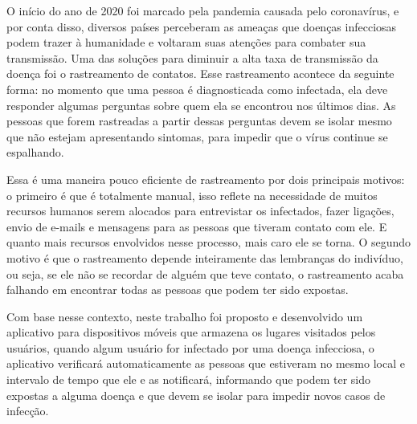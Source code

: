 \documentclass[Portugues,Draft]{tese-FT}
\begin{document}
\begin{resumo}
O início do ano de 2020 foi marcado pela pandemia causada pelo coronavírus, e por conta disso, diversos países perceberam as ameaças que doenças infecciosas podem trazer à humanidade e voltaram suas atenções para combater sua transmissão. 
Uma das soluções para diminuir a alta taxa de transmissão da doença foi o rastreamento de contatos. Esse rastreamento acontece da seguinte forma: no momento que uma pessoa é diagnosticada como infectada, ela deve responder algumas perguntas sobre quem ela se encontrou nos últimos dias. As pessoas que forem rastreadas a partir dessas perguntas devem se isolar mesmo que não estejam apresentando sintomas, para impedir que o vírus continue se espalhando.

Essa é uma maneira pouco eficiente de rastreamento por dois principais motivos: o primeiro é que é totalmente manual, isso reflete na necessidade de muitos recursos humanos serem alocados para entrevistar os infectados, fazer ligações, envio de e-mails e mensagens para as pessoas que tiveram contato com ele. E quanto mais recursos envolvidos nesse processo, mais caro ele se torna. O segundo motivo é que o rastreamento depende inteiramente das lembranças do indivíduo, ou seja, se ele não se recordar de alguém que teve contato, o rastreamento acaba falhando em encontrar todas as pessoas que podem ter sido expostas.

Com base nesse contexto, neste trabalho foi proposto e desenvolvido um aplicativo para dispositivos móveis que armazena os lugares visitados pelos usuários, quando algum usuário for infectado por uma doença infecciosa, o aplicativo verificará automaticamente as pessoas que estiveram no mesmo local e intervalo de tempo que ele e as notificará, informando que podem ter sido expostas a alguma doença e que devem se isolar para impedir novos casos de infecção.
\end{resumo}
\end{document}
